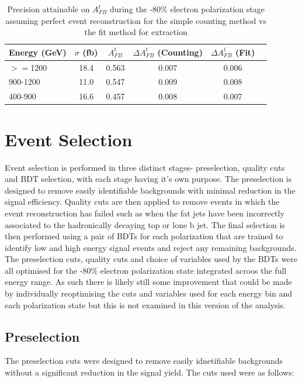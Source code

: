 \begin{table}
  \centering
  \begin{tabular}{l|c|c|c|c|c}
    \toprule
    Energy (GeV) &  $\sigma$ (fb)   & $A_{FB}^t$ & $\Delta A^t_{FB}$ (Counting) & $\Delta A_{FB}^t$ (Fit) \\
    \midrule
    $>=$1200 & 18.4  & 0.563 & 0.007 & 0.006 \\
    \midrule
    900-1200 & 11.0 & 0.547 & 0.009 & 0.008 \\
    \midrule
    400-900 & 16.6 & 0.457 & 0.008 & 0.007 \\
    \bottomrule
  \end{tabular}
  \caption{Precision attainable on $A_{FB}^t$ during the -80\% electron polarization stage assuming perfect event reconstruction for the simple counting method vs the fit method for extraction}
  \label{table:idealresults}
\end{table}


\section{Event Selection}
\label{Event Selection}

Event selection is performed in three distinct stages- preselection, quality cuts and \ac{BDT} selection, with each stage having it's own purpose. The preselection is designed to remove easily identifiable backgrounds with minimal reduction in the signal efficiency. Quality cuts are then applied to remove events in which the event reconstruction has failed such as when the fat jets have been incorrectly associated to the hadronically decaying top or lone b jet. The final selection is then performed using a pair of \ac{BDT}s for each polarization that are trained to identify low and high energy signal events and reject any remaining backgrounds. The preselection cuts, quality cuts and choice of variables used by the \ac{BDT}s were all optimised for the -80\% electron polarization state integrated acroos the full energy range. As such there is likely still some improvement that could be made by individually reoptimising the cuts and variables used for each energy bin and each polarization state but this is not examined in this version of the analysis.

\subsection{Preselection}

The preselection cuts were designed to remove easily idnetifiable backgrounds without a significant reduction in the signal yield. The cuts used were as follows:

